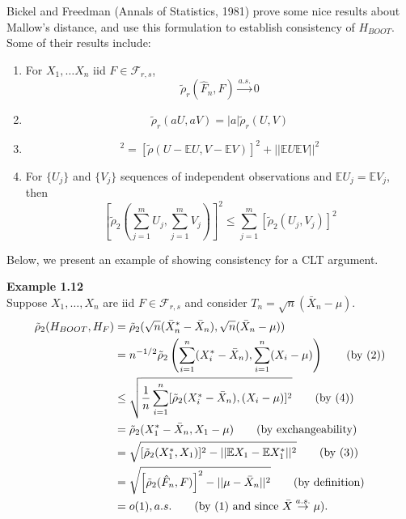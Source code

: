 \documentclass[12pt]{article}
\newcommand{\E}{\mathbb{E}}
\newcommand{\sumn}{\sum_{i=1}^n}
\numberwithin{equation}{section}
\begin{document}
Bickel and Freedman (Annals of Statistics, 1981) prove some nice results about Mallow’s distance, and use this formulation to establish consistency of
$H_{BOOT}$. Some of their results include:

\begin{enumerate}
  \item For $X_1, \ldots X_n$ iid $F \in \mathcal{F}_{r, s}$,
  \begin{equation*}
    \tilde{\rho}_r (\hat{F}_n, F) \overset{a.s.}{\to} 0
  \end{equation*}
  \item \begin{equation*}
    \tilde{\rho}_r(aU, aV) = |a| \tilde{\rho}_r(U, V)
  \end{equation*}
  \item \begin{equation*}
    [\tilde{\rho}_2(U, V)]^2 = 
      [\tilde{\rho}(U - \E U, V - \E V)] ^2 + ||\E U \E V||^2
  \end{equation*}
  \item For $\{ U_j \}$ and $\{ V_j \}$ sequences of independent observations and $\E U_j = \E V_j$, then
  \begin{equation*}
    \left[ 
    \tilde{\rho}_2 
      \left(
        \sum_{j = 1}^m U_j, \sum_{j = 1}^m V_j
      \right)
    \right]^2
    \le 
    \sum_{j = 1}^m [\tilde{\rho}_2(U_j, V_j)]^2
  \end{equation*}
\end{enumerate}

Below, we present an example of showing consistency for a CLT argument.

\textbf{Example 1.12} \\
Suppose $X_1, \ldots, X_n$ are iid $F \in \mathcal{F}_{r, s}$ and consider $T_n = \sqrt{n}(\bar{X}_n - \mu)$.
\begin{align*}
  \tilde{\rho}_2(H_{BOOT}, H_{F})
    &= \tilde{\rho}_2 (\sqrt{n}(\bar{X}_n^* - \bar{X}_n),
      \sqrt{n}(\bar{X}_n - \mu)) \\
    &= n^{-1/2} \tilde{\rho}_2 \left(
      \sumn (X_i^* - \bar{X}_n), \sumn (X_i - \mu)
    \right) \tag{by (2)} \\
    & \le \sqrt{ \frac{1}{n} \sumn 
    [\tilde{\rho}_2 (X_i^* - \bar{X}_n), (X_i - \mu)] ^2
    }  \tag{by (4)} \\
    &= \tilde{\rho}_2(X_1^* - \bar{X}_n, X_1 - \mu) \tag{by exchangeability} \\
    &= \sqrt{[\tilde{\rho}_2(X_1^*, X_1)]^2 - ||\E X_1 - \E X_1^*||^2}  \tag{by (3)} \\
    &= \sqrt{\left[ \tilde{\rho}_2(\hat{F}_n, F) \right] ^ 2
      - ||\mu - \bar{X}_n||^2}  \tag{by definition} \\
    &= o(1), a.s.  \tag{by (1) and since $\bar{X} \overset{a.s.}{\to} \mu$}.
\end{align*}
\end{document}
